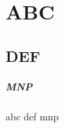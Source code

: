 \documentclass[part2.tex]{subfiles}
\begin{document}
\chapter{ABC}
\section{DEF}
\paragraph{MNP}
abc def mnp
\end{document}
